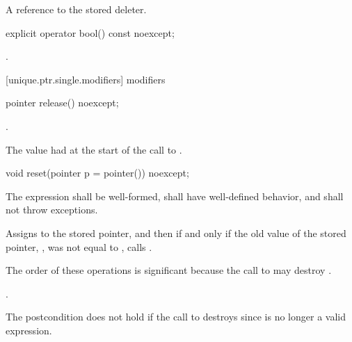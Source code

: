 \begin{itemdescr}
\pnum
\returns A reference to the stored deleter.
\end{itemdescr}

%
\begin{itemdecl}
explicit operator bool() const noexcept;
\end{itemdecl}

\begin{itemdescr}
\pnum
\returns {}.
\end{itemdescr}

[unique.ptr.single.modifiers]{ modifiers}

%
\begin{itemdecl}
pointer release() noexcept;
\end{itemdecl}

\begin{itemdescr}
\pnum
\postconditions {}.

\pnum
\returns The value  had at the start of
the call to .
\end{itemdescr}

%
\begin{itemdecl}
void reset(pointer p = pointer()) noexcept;
\end{itemdecl}

\begin{itemdescr}
\pnum
\requires The expression  shall be well-formed, shall have
well-defined behavior, and shall not throw exceptions.

\pnum
\effects Assigns  to the stored pointer, and then if and only if the old value of the
stored pointer, , was not equal to , calls
. \begin{note} The order of these operations is significant
because the call to  may destroy . \end{note}

\pnum
\postconditions {}.
\begin{note} The postcondition does not hold if the call to 
destroys  since  is no longer a valid expression.
\end{note}
\end{itemdescr}

